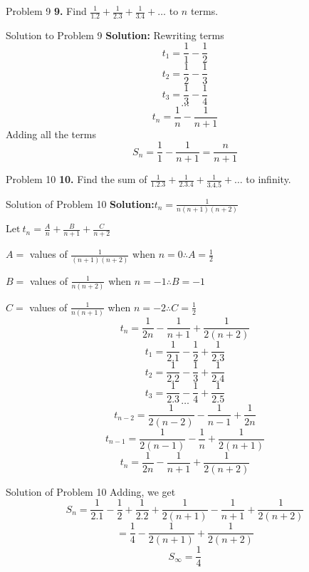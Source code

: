 \documentclass[aspectratio=1610,8pt]{beamer}
\begin{document}
\begin{frame}{Problem 9}
  \textbf{9.} Find $\frac{1}{1.2} + \frac{1}{2.3} + \frac{1}{3.4} + \ldots$ to $n$ terms.
\end{frame}
\begin{frame}{Solution to Problem 9}
  \textbf{Solution:} Rewriting terms
  $$t_1 = \frac{1}{1} - \frac{1}{2}$$
  $$t_2 = \frac{1}{2} - \frac{1}{3}$$
  $$t_3 = \frac{1}{3} - \frac{1}{4}$$
  $$\ldots$$
  $$t_n = \frac{1}{n} - \frac{1}{n + 1}$$
  Adding all the terms
  $$S_n = \frac{1}{1} - \frac{1}{n + 1} = \frac{n}{n + 1}$$
\end{frame}
\begin{frame}{Problem 10}
  \textbf{10.} Find the sum of $\frac{1}{1.2.3} + \frac{1}{2.3.4} + \frac{1}{3.4.5} + \ldots$ to infinity.
\end{frame}
\begin{frame}{Solution of Problem 10}
  \textbf{Solution:}$t_n = \frac{1}{n(n + 1)(n + 2)}$

  $\text{Let}~t_n = \frac{A}{n} + \frac{B}{n + 1} + \frac{C}{n + 2}$

  $A = $ values of $\frac{1}{(n + 1)(n + 2)}$ when $n = 0 \therefore A = \frac{1}{2}$

  $B = $ values of $\frac{1}{n(n + 2)}$ when $n = -1 \therefore B = -1$

  $C = $ values of $\frac{1}{n(n + 1)}$ when $n = -2 \therefore C = \frac{1}{2}$
  $$t_n = \frac{1}{2n} - \frac{1}{n + 1} + \frac{1}{2(n + 2)}$$
  $$t_1 = \frac{1}{2.1} - \frac{1}{2} + \frac{1}{2.3}$$
  $$t_2 = \frac{1}{2.2} - \frac{1}{3} + \frac{1}{2.4}$$
  $$t_3 = \frac{1}{2.3} - \frac{1}{4} + \frac{1}{2.5}$$
  $$\ldots$$
  $$t_{n - 2} = \frac{1}{2(n - 2)} - \frac{1}{n - 1} + \frac{1}{2n}$$
  $$t_{n - 1} = \frac{1}{2(n - 1)} - \frac{1}{n} + \frac{1}{2(n + 1)}$$
  $$t_n = \frac{1}{2n} - \frac{1}{n + 1} + \frac{1}{2(n + 2)}$$
\end{frame}
\begin{frame}{Solution of Problem 10}
  Adding, we get $$S_n = \frac{1}{2.1} - \frac{1}{2} + \frac{1}{2.2} + \frac{1}{2(n + 1)} - \frac{1}{n + 1} + \frac{1}{2(n + 2)}$$
  $$= \frac{1}{4} - \frac{1}{2(n + 1)} + \frac{1}{2(n + 2)}$$
  $$S_\infty = \frac{1}{4}$$
\end{frame}
\end{document}
